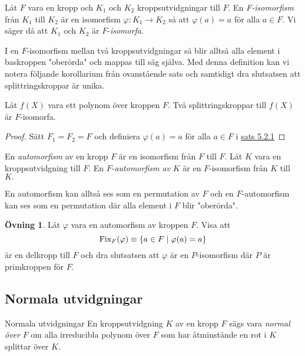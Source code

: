\documentclass{article}
\newcommand{\fix}[0]{\textnormal{Fix}}
\theoremstyle{definition}
\newtheorem{ovning}[thm]{Övning}
\begin{document}
\begin{mydef}{}{}
  Låt $F$ vara en kropp och $K_1$ och $K_2$ kroppsutvidgningar till $F$. En \textit{F-isomorfism} från $K_1$ till $K_2$ är en isomorfism 
  $\varphi: K_1 \rightarrow K_2$ så att $\varphi(a) = a$ för alla $a \in F.$ Vi säger då att $K_1$ och $K_2$ är $F$-\textit{isomorfa}.
\end{mydef}
I en $F$-isomorfism mellan två kroppsutvidgningar så blir alltså alla element i baskroppen "oberörda" och mappas till säg själva. Med denna definition 
kan vi notera följande korollarium från ovanstående sats och samtidigt dra slutsatsen att splittringskroppar är unika.

\hypertarget{kol6.2.1}{}
\begin{mykol}{}{}
  Låt $f(X)$ vara ett polynom över kroppen $F$. Två splittringskroppar till $f(X)$ är $F$-isomorfa. 
\end{mykol}
\begin{proof}
  Sätt $F_1 = F_2 = F$ och definiera $\varphi(a) = a$ för alla $a \in F$ i \hyperlink{sats6.0.1}{sats 5.2.1}
\end{proof}

\begin{mydef}{}{}
  En \textit{automorfism} av en kropp $F$ är en isomorfism från $F$ till $F$. Låt $K$ vara en kroppsutvidgning till $F$. 
  En $F$-\textit{automorfism av} $K$
  är en $F$-isomorfism från $K$ till $K.$
\end{mydef}
En automorfism kan alltså ses som en permutation av $F$ och en $F$-automorfism kan ses som en permutation där alla element i $F$ blir "oberörda".

\begin{ovning}
Låt $\varphi$ vara en automorfism av kroppen $F$. Visa att
  \[\fix_F(\varphi) \equiv \{a \in F \; | \; \varphi(a) = a\}\]
  är en delkropp till $F$ och dra slutsatsen att $\varphi$ är en $P$-isomorfism där $P$ är primkroppen för $F$.
\end{ovning}

\subsection{Normala utvidgningar}
\begin{mydef}{Normala utvidgningar}{}
  En kroppsutvidgning $K$ av en kropp $F$ sägs vara \textit{normal över} $F$ om alla irreducibla polynom över $F$ som har åtminstånde en rot i $K$ splittar 
  över $K$.
\end{mydef}
\end{document}

